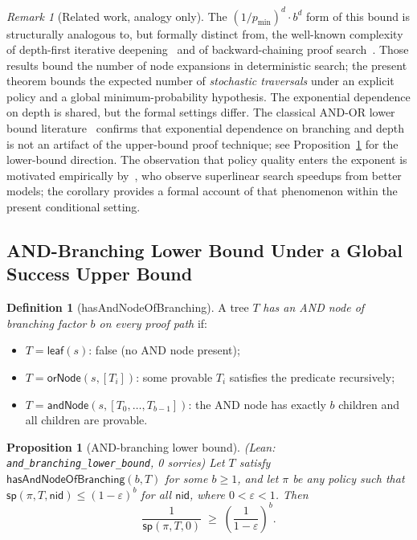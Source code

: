\documentclass[reqno,11pt]{amsart}
\newcommand{\sP}{\mathsf{sp}}
\newcommand{\leafN}{\mathsf{leaf}}
\newcommand{\orN}{\mathsf{orNode}}
\newcommand{\andN}{\mathsf{andNode}}
\newcommand{\nid}{\mathsf{nid}}
\newcommand{\hasAnd}{\mathsf{hasAndNodeOfBranching}}
\newcommand{\leanverified}[1]{\textup{(Lean: \texttt{\small #1}, 0 sorries)}}
\theoremstyle{plain}
\newtheorem{proposition}[theorem]{Proposition}
\theoremstyle{definition}
\newtheorem{definition}[theorem]{Definition}
\theoremstyle{remark}
\newtheorem{remark}[theorem]{Remark}
\begin{document}
\begin{remark}[Related work, analogy only]
The $(1/p_{\min})^d \cdot b^d$ form of this bound is structurally analogous to, but formally distinct from, the well-known complexity of depth-first iterative deepening~\citep{Korf1985} and of backward-chaining proof search~\citep{Stickel1988}. Those results bound the number of node expansions in deterministic search; the present theorem bounds the expected number of \emph{stochastic traversals} under an explicit policy and a global minimum-probability hypothesis. The exponential dependence on depth is shared, but the formal settings differ. The classical AND-OR lower bound literature~\citep{Snir1985,SaksWigderson1986} confirms that exponential dependence on branching and depth is not an artifact of the upper-bound proof technique; see Proposition~\ref{thm:lower} for the lower-bound direction. The observation that policy quality enters the exponent is motivated empirically by~\citet{PoluHan2020}, who observe superlinear search speedups from better models; the corollary provides a formal account of that phenomenon within the present conditional setting.
\end{remark}

\subsection{AND-Branching Lower Bound Under a Global Success Upper Bound}

\begin{definition}[hasAndNodeOfBranching]
A tree $T$ \emph{has an AND node of branching factor $b$ on every proof path} if:
\begin{itemize}[leftmargin=*]
\item $T = \leafN(s)$: false (no AND node present);
\item $T = \orN(s, [T_i])$: some provable $T_i$ satisfies the predicate recursively;
\item $T = \andN(s, [T_0,\ldots,T_{b-1}])$: the AND node has exactly $b$ children and all children are provable.
\end{itemize}
\end{definition}

\begin{proposition}[AND-branching lower bound]\label{thm:lower}
\leanverified{and\_branching\_lower\_bound}
Let $T$ satisfy $\hasAnd(b, T)$ for some $b \ge 1$, and let $\pi$ be any policy such that $\sP(\pi, T, \nid) \le (1-\varepsilon)^b$ for all $\nid$, where $0 < \varepsilon < 1$. Then
\[
\frac{1}{\sP(\pi, T, 0)} \;\ge\; \left(\frac{1}{1-\varepsilon}\right)^b.
\]
\end{proposition}
\end{document}
